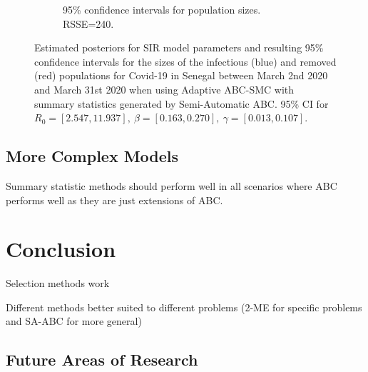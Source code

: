 \documentclass[11pt,a4paper]{article}
\theoremstyle{break}
\begin{document}
\begin{figure}[H]
{\begin{subfigure}{.45\paperwidth}
        \caption{95\% confidence intervals for population sizes. RSSE=240.}
        \label{fig_senegal_semi_auto_ci}
      \end{subfigure}
    }
    \caption{Estimated posteriors for SIR model parameters and resulting 95\% confidence intervals for the sizes of the infectious (blue) and removed (red) populations for Covid-19 in Senegal between March 2nd 2020 and March 31st 2020 when using Adaptive ABC-SMC with summary statistics generated by Semi-Automatic ABC. 95\% CI for $R_0=[2.547,11.937],\ \beta=[0.163,0.270],\ \gamma=[0.013,0.107]$.}
    \label{}
  \end{figure}


\subsection{More Complex Models}\label{sec_more_complex_models}

  \par Summary statistic methods should perform well in all scenarios where ABC performs well as they are just extensions of ABC.

\newpage
\section{Conclusion}

  \par Selection methods work
  \par Different methods better suited to different problems (2-ME for specific problems and SA-ABC for more general)

\subsection{Future Areas of Research}


\newpage
\setcounter{page}{1}


\end{document}
